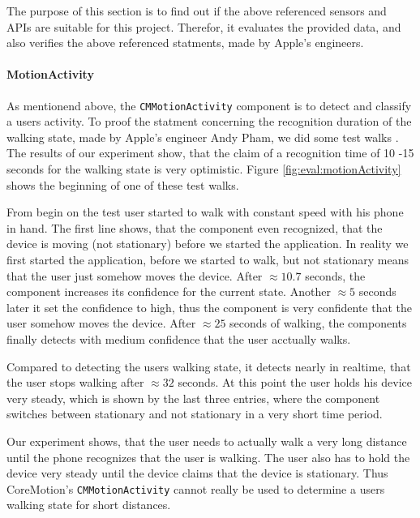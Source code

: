 The purpose of this section is to find out if the above referenced sensors and \acsp{API} are suitable for this project.
Therefor, it evaluates the provided data, and also verifies the above referenced statments, made by Apple's engineers.


\paragraph{MotionActivity}

As mentionend above, the \texttt{CMMotionActivity} component is to detect and classify a users activity.
To proof the statment concerning the recognition duration of the walking state, made by Apple's engineer Andy Pham, we did some test walks \cite{wwdc_2014}.
The results of our experiment show, that the claim of a recognition time of 10 -15 seconds for the walking state is very optimistic.
Figure \ref{fig:eval:motionActivity} shows the beginning of one of these test walks.

From begin on the test user started to walk with constant speed with his phone in hand.
The first line shows, that the component even recognized, that the device is moving (not stationary) before we started the application.
In reality we first started the application, before we started to walk, but not stationary means that the user just somehow moves the device.
After $\approx 10.7$ seconds, the component increases its confidence for the current state.
Another $\approx 5$ seconds later it set the confidence to high, thus the component is very confidente that the user somehow moves the device.
After $\approx 25$ seconds of walking, the components finally detects with medium confidence that the user acctually walks.

Compared to detecting the users walking state, it detects nearly in realtime, that the user stops walking after $\approx 32$ seconds.
At this point the user holds his device very steady, which is shown by the last three entries, where the component switches between stationary and not stationary in a very short time period.

Our experiment shows, that the user needs to actually walk a very long distance until the phone recognizes that the user is walking.
The user also has to hold the device very steady until the device claims that the device is stationary.
Thus CoreMotion's \texttt{CMMotionActivity} cannot really be used to determine a users walking state for short distances.

